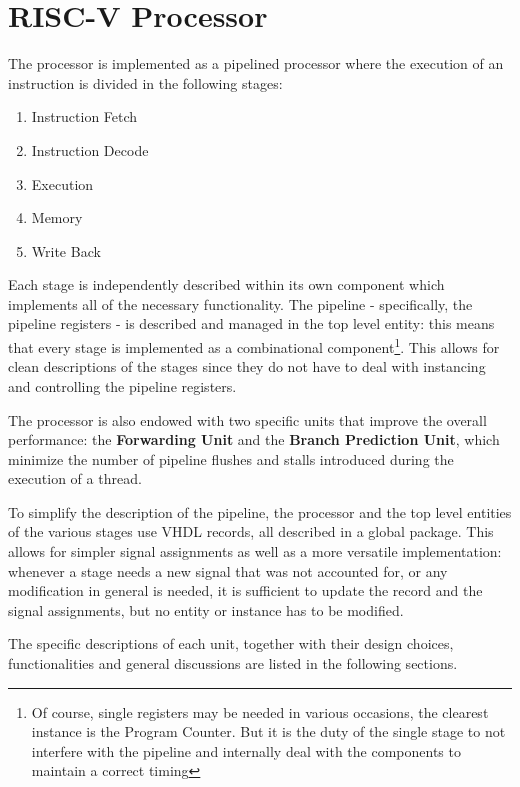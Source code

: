 \section{RISC-V Processor}
The processor is implemented as a pipelined processor where the execution of an instruction is divided in the following
stages:
\begin{enumerate}
    \item Instruction Fetch
    \item Instruction Decode
    \item Execution
    \item Memory
    \item Write Back
\end{enumerate}

Each stage is independently described within its own component which implements all of the necessary functionality. The
pipeline - specifically, the pipeline registers - is described and managed in the top level entity:
this means that every stage is implemented as a combinational component\footnote{Of course, single registers may be
needed in various occasions, the clearest instance is the Program Counter. But it is the duty of the single stage to
not interfere with the pipeline and internally deal with the components to maintain a correct timing}. This allows for
clean descriptions of the stages since they do not have to deal with instancing and controlling the pipeline registers.

The processor is also endowed with two specific units that improve the overall performance: the
\textbf{Forwarding Unit} and the \textbf{Branch Prediction Unit}, which minimize the number of pipeline flushes and
stalls introduced during the execution of a thread.

To simplify the description of the pipeline, the processor and the top level entities of the various stages use
VHDL records, all described in a global package. This allows for simpler signal assignments as well as a more versatile
implementation: whenever a stage needs a new signal that was not accounted for, or any modification in general is
needed, it is sufficient to update the record and the signal assignments, but no entity or instance has to be modified.

The specific descriptions of each unit, together with their design choices, functionalities and general discussions
are listed in the following sections.
